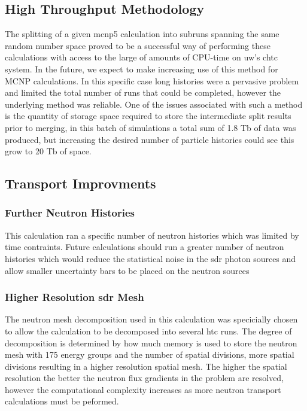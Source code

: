 \documentclass[12pt]{article}
\begin{document}
\subsection*{High Throughput Methodology}
The splitting of a given \gls{mcnp5} calculation into subruns spanning the same random
number space proved to be a successful way of performing these calculations with
access to the large of amounts of CPU-time on \gls{uw}'s \gls{chtc} system. In
the future, we expect to make increasing use of this method for MCNP
calculations. In this specific case long histories were a pervasive problem and
limited the total number of runs that could be completed, however the underlying
method was reliable. One of the issues associated with such a method is the
quantity of storage space required to store the intermediate split results prior
to merging, in this batch of simulations a total sum of 1.8 Tb of data was
produced, but increasing the desired number of particle histories could see this 
grow to 20 Tb of space.

\subsection*{ Transport Improvments}
\subsubsection*{Further Neutron Histories}
This calculation ran a specific number of neutron histories which was limited by
time contraints. Future calculations should run a greater number of neutron histories
which would reduce the statistical noise in the \gls{sdr} photon sources and allow
smaller uncertainty bars to be placed on the neutron sources 

\subsubsection*{Higher Resolution \gls{sdr} Mesh}
The neutron mesh decomposition used in this calculation was specicially chosen
to allow the calculation to be decomposed into several \gls{htc} runs. The degree of 
decomposition is determined by how much memory is used to store the neutron mesh
with 175 energy groups and the number of spatial divisions, more spatial divisions
resulting in a higher resolution spatial mesh. The higher the spatial resolution the 
better the neutron flux gradients in the problem are resolved, however the computational
complexity increases as more neutron transport calculations must be peformed. 
\end{document}
